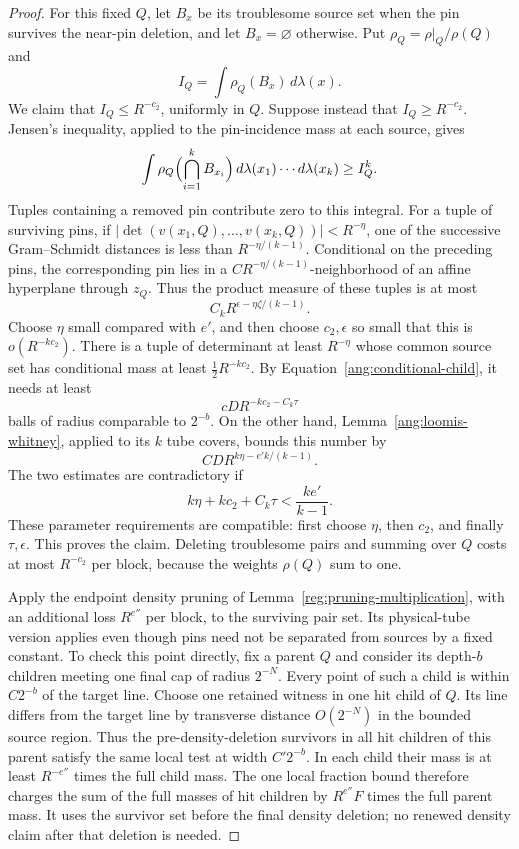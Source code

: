 \begin{proof}
For this fixed $Q$, let $B_x$ be its troublesome source set when the
pin survives the near-pin deletion, and let $B_x=\varnothing$ otherwise.
Put $\rho_Q=\rho|_Q/\rho(Q)$ and
\[
 I_Q=\int\rho_Q(B_x)\,d\lambda(x).
\]
We claim that $I_Q\le R^{-c_2}$, uniformly in $Q$. Suppose instead that
$I_Q\ge R^{-c_2}$. Jensen's inequality, applied to the pin-incidence
mass at each source, gives
\begin{equation}\label{ang:common-k-incidence}
 \int \rho_Q\Bigl(\bigcap_{i=1}^k B_{x_i}\Bigr)
           \,d\lambda(x_1)\cdots d\lambda(x_k)
      \ge I_Q^k.
\end{equation}
Tuples containing a removed pin contribute zero to this integral. For a
tuple of surviving pins, if
$|\det(v(x_1,Q),\ldots,v(x_k,Q))|<R^{-\eta}$, one of the
successive Gram--Schmidt distances is less than
$R^{-\eta/(k-1)}$. Conditional on the preceding pins, the corresponding
pin lies in a $C R^{-\eta/(k-1)}$-neighborhood of an affine hyperplane
through $z_Q$. Thus the product measure of these tuples is at most
\[
 C_kR^{\epsilon-\eta\zeta/(k-1)}.
\]
Choose $\eta$ small compared with $e'$, and then choose
$c_2,\epsilon$ so small that this is $o(R^{-kc_2})$. There is a tuple
of determinant at least $R^{-\eta}$ whose common source set has
conditional mass at least $\tfrac12R^{-kc_2}$. By
Equation~\eqref{ang:conditional-child}, it needs at least
\[
 c D R^{-kc_2-C_k\tau}
\]
balls of radius comparable to $2^{-b}$. On the other hand,
Lemma~\ref{ang:loomis-whitney}, applied to its $k$ tube covers, bounds
this number by
\[
 C D R^{k\eta-e'k/(k-1)}.
\]
The two estimates are contradictory if
\[
 k\eta+kc_2+C_k\tau<\frac{ke'}{k-1}.
\]
These parameter requirements are compatible: first choose $\eta$,
then $c_2$, and finally $\tau,\epsilon$. This proves the claim.
Deleting troublesome pairs and summing over $Q$ costs at most
$R^{-c_2}$ per block, because the weights $\rho(Q)$ sum to one.

Apply the endpoint density pruning of
Lemma~\ref{reg:pruning-multiplication}, with an additional loss
$R^{e''}$ per block, to the surviving pair set. Its physical-tube
version applies even though pins need not be separated from sources
by a fixed constant. To check this point directly, fix a parent $Q$ and
consider its depth-$b$ children meeting one final cap of radius
$2^{-N}$. Every point of such a child is within $C2^{-b}$ of the
target line. Choose one retained witness in one hit child of $Q$.
Its line differs from the target line by transverse distance
$O(2^{-N})$ in the bounded source region. Thus the pre-density-deletion
survivors in all hit children of this parent satisfy the same local
test at width $C'2^{-b}$. In each child their mass is at least
$R^{-e''}$ times the full child mass. The one local fraction bound
therefore charges the sum of the full masses of hit children by
$R^{e''}F$ times the full parent mass. It uses the
survivor set before the final density deletion; no renewed density
claim after that deletion is needed.


\end{proof}
